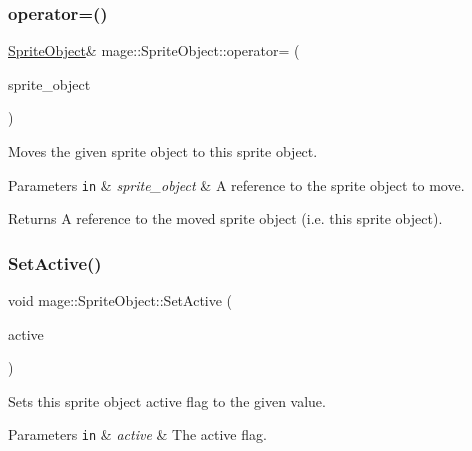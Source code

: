 \subsubsection{\texorpdfstring{operator=()}{operator=()}\hspace{0.1cm}{\footnotesize\ttfamily [2/2]}}
{\footnotesize\ttfamily \hyperlink{classmage_1_1_sprite_object}{Sprite\+Object}\& mage\+::\+Sprite\+Object\+::operator= (\begin{DoxyParamCaption}\item[{\hyperlink{classmage_1_1_sprite_object}{Sprite\+Object} \&\&}]{sprite\+\_\+object }\end{DoxyParamCaption})\hspace{0.3cm}{\ttfamily [delete]}}

Moves the given sprite object to this sprite object.


\begin{DoxyParams}[1]{Parameters}
\mbox{\tt in}  & {\em sprite\+\_\+object} & A reference to the sprite object to move. \\
\hline
\end{DoxyParams}
\begin{DoxyReturn}{Returns}
A reference to the moved sprite object (i.\+e. this sprite object). 
\end{DoxyReturn}
\hypertarget{classmage_1_1_sprite_object_a8f27da427493db1567b842b83fa10f65}{}\label{classmage_1_1_sprite_object_a8f27da427493db1567b842b83fa10f65} 
\subsubsection{\texorpdfstring{Set\+Active()}{SetActive()}}
{\footnotesize\ttfamily void mage\+::\+Sprite\+Object\+::\+Set\+Active (\begin{DoxyParamCaption}\item[{bool}]{active }\end{DoxyParamCaption})\hspace{0.3cm}{\ttfamily [noexcept]}}

Sets this sprite object active flag to the given value.


\begin{DoxyParams}[1]{Parameters}
\mbox{\tt in}  & {\em active} & The active flag. \\
\hline
\end{DoxyParams}
\hypertarget{classmage_1_1_sprite_object_a784cd7d61f3a9f71a521656ae3199366}{}\label{classmage_1_1_sprite_object_a784cd7d61f3a9f71a521656ae3199366} 
